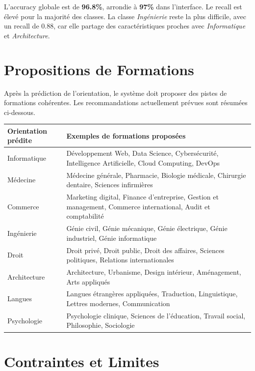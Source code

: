 \documentclass[12pt,a4paper]{report}
\begin{document}
L'accuracy globale est de \textbf{96.8\%}, arrondie à \textbf{97\%} dans l'interface. Le recall est élevé pour la majorité des classes. La classe \textit{Ingénierie} reste la plus difficile, avec un recall de 0.88, car elle partage des caractéristiques proches avec \textit{Informatique} et \textit{Architecture}.

\chapter{Propositions de Formations}

Après la prédiction de l'orientation, le système doit proposer des pistes de formations cohérentes. Les recommandations actuellement prévues sont résumées ci-dessous.

\begin{longtable}{>{\raggedright\arraybackslash}p{4cm} >{\raggedright\arraybackslash}p{9cm}}
\toprule
\textbf{Orientation prédite} & \textbf{Exemples de formations proposées} \\
\midrule
Informatique & Développement Web, Data Science, Cybersécurité, Intelligence Artificielle, Cloud Computing, DevOps \\
Médecine & Médecine générale, Pharmacie, Biologie médicale, Chirurgie dentaire, Sciences infirmières \\
Commerce & Marketing digital, Finance d'entreprise, Gestion et management, Commerce international, Audit et comptabilité \\
Ingénierie & Génie civil, Génie mécanique, Génie électrique, Génie industriel, Génie informatique \\
Droit & Droit privé, Droit public, Droit des affaires, Sciences politiques, Relations internationales \\
Architecture & Architecture, Urbanisme, Design intérieur, Aménagement, Arts appliqués \\
Langues & Langues étrangères appliquées, Traduction, Linguistique, Lettres modernes, Communication \\
Psychologie & Psychologie clinique, Sciences de l'éducation, Travail social, Philosophie, Sociologie \\
\bottomrule
\end{longtable}

\chapter{Contraintes et Limites}
\end{document}

